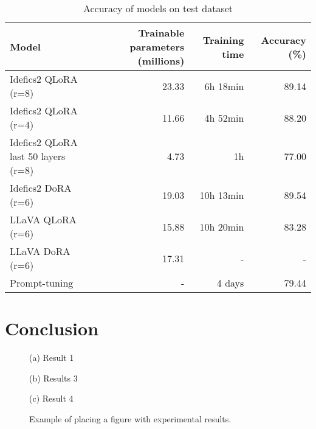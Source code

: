 \documentclass{article}
\begin{document}
\begin{table}[h]
\begin{minipage}[b]{2.0\linewidth}
  \centering
  \caption{Accuracy of models on test dataset}
  \begin{tabular}{lrrr}
    \hline
    Model & Trainable parameters (millions) & Training time & Accuracy (\%)\\ 
    \hline
    Idefics2 QLoRA (r=8) & 23.33 & 6h 18min & 89.14\\ 
    Idefics2 QLoRA (r=4) & 11.66 & 4h 52min & 88.20\\ 
    Idefics2 QLoRA last 50 layers (r=8) & 4.73 & 1h & 77.00\\
    Idefics2 DoRA (r=6) & 19.03 & 10h 13min & 89.54\\
    LLaVA QLoRA (r=6) & 15.88 & 10h 20min & 83.28\\
    LLaVA DoRA (r=6) & 17.31 & - & -\\
    Prompt-tuning & - & 4 days & 79.44\\
    \hline
  \end{tabular}
  \label{tab:model_performance}
\end{minipage}
\end{table}

\section{Conclusion}
\label{sec:conclusion}



\begin{figure}[htb]

\begin{minipage}[b]{1.0\linewidth}
  \centering
  \centerline{(a) Result 1}\medskip
\end{minipage}
%
\begin{minipage}[b]{.48\linewidth}
  \centering
  \centerline{(b) Results 3}\medskip
\end{minipage}
\hfill
\begin{minipage}[b]{0.48\linewidth}
  \centering
  \centerline{(c) Result 4}\medskip
\end{minipage}
%
\caption{Example of placing a figure with experimental results.}
\label{fig:res}
%
\end{figure}
\end{document}
